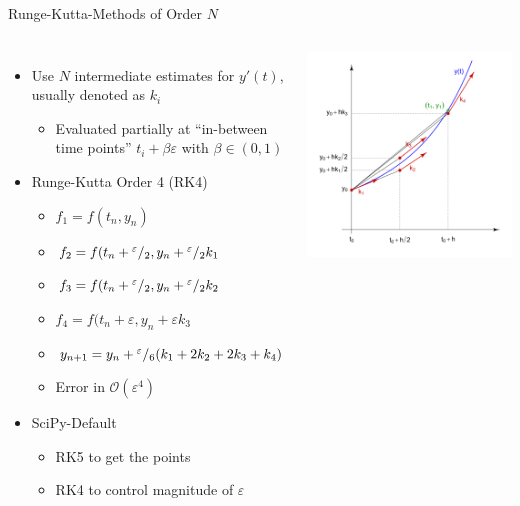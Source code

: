 \begin{frame}{Runge-Kutta-Methods of Order $N$}
%
\begin{columns}
\begin{itemize}
\item Use $N$ intermediate estimates for $y'(t)$, usually denoted as $k_i$
	\begin{itemize}
	\item Evaluated partially at \enquote{in-between time points} $t_i + \beta \varepsilon$ with $\beta \in (0, 1)$
	\end{itemize}
\item Runge-Kutta Order 4 (RK4)
	\begin{itemize}
	\item $f_1 = f(t_n, y_n)$
	\item $f_2 = f(t_n + {}^{\varepsilon}/_{2}, y_n + {}^{\varepsilon}/_{2} k_1$
	\item $f_3 = f(t_n + {}^{\varepsilon}/_{2}, y_n + {}^{\varepsilon}/_{2} k_2$
	\item $f_4 = f(t_n + \varepsilon, y_n + \varepsilon k_3$
	\item[\Thus] $y_{n+1} = y_n + {}^{\varepsilon}/_{6}(k_1 + 2k_2 + 2k_3 + k_4)$
	\item[\Thus] Error in $\mathcal{O}(\varepsilon^4)$
	\end{itemize}
\item SciPy-Default
	\begin{itemize}
	\item RK5 to get the points
	\item RK4 to control magnitude of $\varepsilon$
	\end{itemize}
\end{itemize}
%
\includegraphics[width=\linewidth]{./gfx/07-Runge-Kutta}


\end{columns}
\end{frame}
